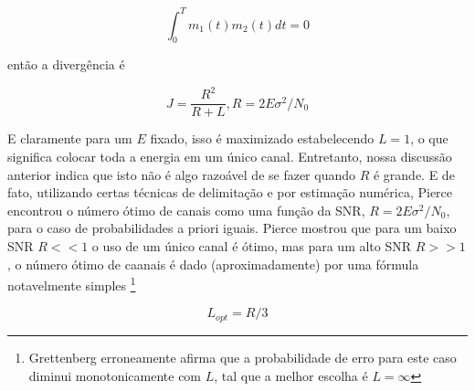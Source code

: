\documentclass{sbrt2017port}
\begin{document}
\begin{equation}
 \int_{0}^{T} m_1(t)m_2(t)dt = 0
 \label{eq21}
\end{equation}

então a divergência é

\begin{equation}
 J = \frac{R^2}{R+L}, R = 2E\sigma^2/N_0
 \label{eq22}
\end{equation}

E claramente para um $E$ fixado, isso é maximizado estabelecendo $L=1$, o que significa colocar toda a energia em um único canal. Entretanto, nossa discussão anterior indica que isto não é algo razoável de se fazer quando $R$ é grande. E de fato, utilizando certas técnicas de delimitação e por estimação numérica, Pierce \cite{r21} encontrou o número ótimo de canais como uma função da SNR, $ R = 2E\sigma^2/N_0 $, para o caso de probabilidades a priori iguais. Pierce mostrou que para um baixo SNR $R << 1$ o uso de um único canal é ótimo, mas para um alto SNR $R >> 1$, o número ótimo de caanais é dado (aproximadamente) por uma fórmula notavelmente simples \footnote [7] {Grettenberg \cite{r10} 	erroneamente afirma que a probabilidade de erro para este caso diminui monotonicamente com $L$, tal que a melhor escolha é $L = \infty$}

\begin{equation}
 L_{opt} = R/3
 \label{eq23}
\end{equation}
\end{document}
